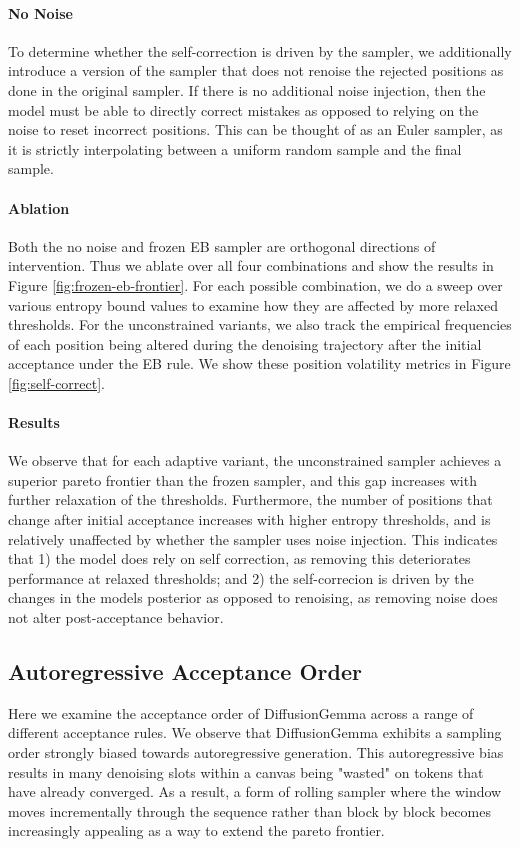 \paragraph{No Noise}
To determine whether the self-correction is driven by the sampler, we additionally introduce a version of the sampler that does not renoise the rejected positions as done in the original sampler. 
If there is no additional noise injection, then the model must be able to directly correct mistakes as opposed to relying on the noise to reset incorrect positions.
This can be thought of as an Euler sampler, as it is strictly interpolating between a uniform random sample and the final sample.

\paragraph{Ablation}
Both the no noise and frozen EB sampler are orthogonal directions of intervention. Thus we ablate over all four combinations and show the results in Figure \ref{fig:frozen-eb-frontier}.
For each possible combination, we do a sweep over various entropy bound values to examine how they are affected by more relaxed thresholds. 
For the unconstrained variants, we also track the empirical frequencies of each position being altered during the denoising trajectory after the initial acceptance under the EB rule.
We show these position volatility metrics in Figure \ref{fig:self-correct}.


\paragraph{Results}
We observe that for each adaptive variant, the unconstrained sampler achieves a superior pareto frontier than the frozen sampler, and this gap increases with further relaxation of the thresholds.
Furthermore, the number of positions that change after initial acceptance increases with higher entropy thresholds, and is relatively unaffected by whether the sampler uses noise injection.
This indicates that 1) the model does rely on self correction, as removing this deteriorates performance at relaxed thresholds; and 2) the self-correcion is driven by the changes in the models posterior as opposed to renoising, as removing noise does not alter post-acceptance behavior.

\subsection{Autoregressive Acceptance Order}
Here we examine the acceptance order of DiffusionGemma across a range of different acceptance rules.
We observe that DiffusionGemma exhibits a sampling order strongly biased towards autoregressive generation.
This autoregressive bias results in many denoising slots within a canvas being "wasted" on tokens that have already converged.
As a result, a form of rolling sampler where the window moves incrementally through the sequence rather than block by block becomes increasingly appealing as a way to extend the pareto frontier.

